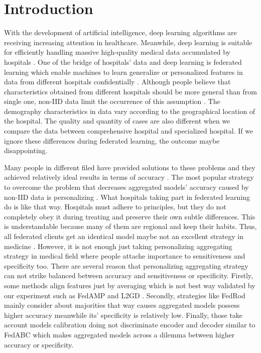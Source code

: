 \documentclass[journal]{IEEEtran}
\begin{document}
\section{Introduction}
With the development of artificial intelligence, deep learning algorithms are receiving increasing attention in healthcare. Meanwhile, deep learning is suitable for efficiently handling massive high-quality medical data accumulated by hospitals \cite{Litjens2017ASO}. One of the bridge of hospitals' data and deep learning is federated learning  which enable machines to learn generalize  or personalized features in data from different hospitals confidentially \cite{Saha2020FederatedTL}. Although people believe that characteristics obtained from different hospitals should be more general than from single one,  non-IID data limit the occurrence of this assumption \cite{Li2021FederatedLO}. The demography characteristics in data vary according to the geographical location of the hospital. The quality and quantity of cases are also different when we compare the data between comprehensive hospital and specialized hospital. If we ignore these differences during federated learning, the outcome maybe disappointing.

Many people in different filed have provided solutions to these problems and they achieved relatively ideal results in terms of accuracy \cite{Zhu2021FederatedLO}. The most popular strategy to overcome the problem that decreases aggregated models' accuracy caused by non-IID data is personalizing \cite{Kulkarni2020SurveyOP}. What hospitals taking part in federated learning do is like that way. Hospitals must adhere to principles, but they do not completely obey it during treating and preserve their own subtle differences. This is understandable because many of them are regional and keep their habits. Thus, all federated clients get an identical model maybe not an excellent strategy  in medicine \cite{Tan2021TowardsPF}. However, it is not enough just taking personalizing aggregating strategy in medical field where people attache importance to sensitiveness and specificity too. There are several reason that personalizing aggregating strategy can not strike balanced between accuracy and sensitiveness or specificity. Firstly, some methods align features just by averaging which is not best way validated by our experiment such as FedAMP \cite{Huang2020PersonalizedCF} and L2GD \cite{Hanzely2020FederatedLO}. Secondly, strategies like FedRod \cite{Chen2022OnBG} mainly consider about majorities that way causes aggregated models possess higher accuracy meanwhile its' specificity is relatively low. Finally, those take account models calibration doing not discriminate encoder and decoder similar to FedABC \cite{Wang2023FedABCTF} which makes aggregated models across a dilemma between higher accuracy or specificity.
\end{document}
